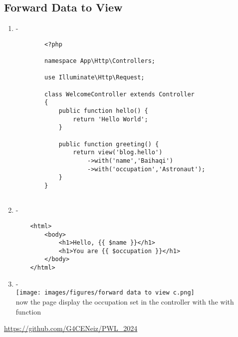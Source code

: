 \documentclass[12pt,titlepage]{article}
\begin{document}
\subsection{Forward Data to View}
\begin{enumerate}[label=\alph*.]
    \item -
    \begin{verbatim}
        <?php

        namespace App\Http\Controllers;
        
        use Illuminate\Http\Request;
        
        class WelcomeController extends Controller
        {
            public function hello() {
                return 'Hello World';
            }
        
            public function greeting() {
                return view('blog.hello')
                    ->with('name','Baihaqi')
                    ->with('occupation','Astronaut');
            }
        }
        
    \end{verbatim}
    \newpage
    \item -
    \begin{verbatim}
    <html>
        <body>
            <h1>Hello, {{ $name }}</h1>
            <h1>You are {{ $occupation }}</h1>
        </body>
    </html>
    \end{verbatim}
    \item - \\ \texttt{[image: images/figures/forward data to view c.png]} \\ now the page display the occupation set in the controller with the with function
\end{enumerate}

\url{https://github.com/G4CENeiz/PWL_2024}
\end{document}
